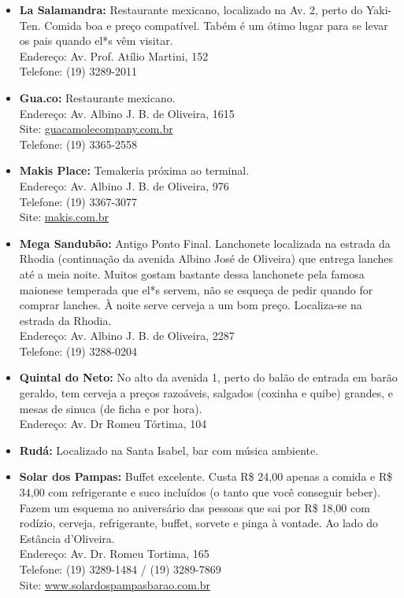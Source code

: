 \begin{itemize}
    \item   \textbf{La Salamandra:} Restaurante mexicano, localizado na Av. 2,
        perto do Yaki-Ten. Comida boa e preço compatível. Tabém é um ótimo lugar
        para se levar os pais quando el*s vêm visitar.
        \\Endereço: Av. Prof. Atílio Martini, 152
        \\Telefone: (19) 3289-2011
	
	\item	\textbf{Gua.co:} Restaurante mexicano.
		\\Endereço: Av. Albino J. B. de Oliveira, 1615
		\\Site: \url{guacamolecompany.com.br}	
		\\Telefone: (19) 3365-2558
		
    \item   \textbf{Makis Place:} Temakeria próxima ao terminal.
        \\Endereço: Av. Albino J. B. de Oliveira, 976
        \\Telefone: (19) 3367-3077
        \\Site: \url{makis.com.br}

    \item   \textbf{Mega Sandubão:} 
      Antigo Ponto Final. Lanchonete localizada na estrada da Rhodia
      (continuação da avenida Albino José de Oliveira) que entrega
      lanches até a meia noite. Muitos gostam bastante dessa
      lanchonete pela famosa maionese temperada que el*s servem, não
      se esqueça de pedir quando for comprar lanches. À noite serve
      cerveja a um bom preço. Localiza-se na estrada da Rhodia.
        \\Endereço: Av. Albino J. B. de Oliveira, 2287
        \\Telefone: (19) 3288-0204

    \item   \textbf{Quintal do Neto:} No alto da avenida 1, perto do balão de
        entrada em barão geraldo, tem cerveja a preços razoáveis, salgados
        (coxinha e quibe) grandes, e mesas de sinuca (de ficha e por hora).
        \\Endereço: Av. Dr Romeu Tórtima, 104

    \item   \textbf{Rudá:} Localizado na Santa Isabel, bar com música ambiente.

    \item   \textbf{Solar dos Pampas:} Buffet excelente. Custa R\$ 24,00 apenas
        a comida e R\$ 34,00 com refrigerante e suco incluídos (o tanto que você
        conseguir beber). Fazem um esquema no aniversário das pessoas que sai
        por R\$ 18,00 com rodízio, cerveja, refrigerante, buffet, sorvete e
        pinga à vontade. Ao lado do Estância d'Oliveira.
        \\Endereço: Av. Dr. Romeu Tortima, 165
        \\Telefone: (19) 3289-1484 / (19) 3289-7869
        \\Site: \url{www.solardospampasbarao.com.br}


\end{itemize}
